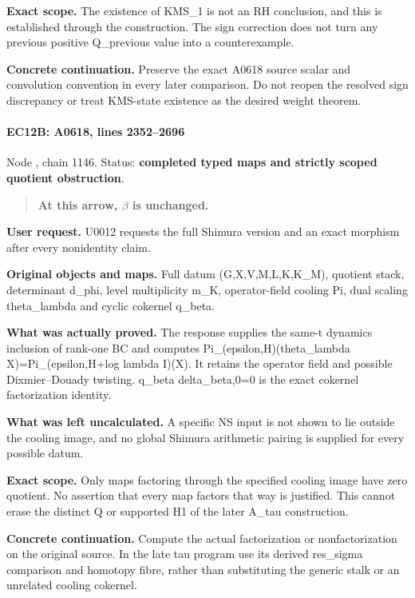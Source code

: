 \textbf{Exact scope.} The existence of KMS\_1 is not an RH conclusion,
and this is established through the construction. The sign correction
does not turn any previous positive Q\_previous value into a
counterexample.

\textbf{Concrete continuation.} Preserve the exact A0618 source scalar
and convolution convention in every later comparison. Do not reopen the
resolved sign discrepancy or treat KMS-state existence as the desired
weight theorem.

\paragraph{EC12B: A0618, lines
2352--2696}\label{ec12b-a0618-lines-23522696}

Node \protect{}, chain 1146.
Status: \textbf{completed typed maps and strictly scoped quotient
obstruction}.

\begin{quote}
\textbf{At this arrow, \(\beta\) is unchanged.}
\end{quote}

\textbf{User request.} U0012 requests the full Shimura version and an
exact morphism after every nonidentity claim.

\textbf{Original objects and maps.} Full datum (G,X,V,M,L,K,K\_M),
quotient stack, determinant d\_phi, level multiplicity m\_K,
operator-field cooling Pi, dual scaling theta\_lambda and cyclic
cokernel q\_beta.

\textbf{What was actually proved.} The response supplies the same-t
dynamics inclusion of rank-one BC and computes
Pi\_(epsilon,H)(theta\_lambda X)=Pi\_(epsilon,H+log lambda I)(X). It
retains the operator field and possible Dixmier--Douady twisting.
q\_beta delta\_beta,0=0 is the exact cokernel factorization identity.

\textbf{What was left uncalculated.} A specific NS input is not shown to
lie outside the cooling image, and no global Shimura arithmetic pairing
is supplied for every possible datum.

\textbf{Exact scope.} Only maps factoring through the specified cooling
image have zero quotient. No assertion that every map factors that way
is justified. This cannot erase the distinct Q or supported H1 of the
later A\_tau construction.

\textbf{Concrete continuation.} Compute the actual factorization or
nonfactorization on the original source. In the late tau program use its
derived res\_sigma comparison and homotopy fibre, rather than
substituting the generic stalk or an unrelated cooling cokernel.

